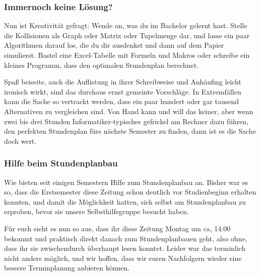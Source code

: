 \begin{multicols}{2}
\subsubsection{Immernoch keine Lösung?}
Nun ist Kreativität gefragt: Wende an, was du im Bachelor gelernt hast. Stelle die Kollisionen als Graph oder Matrix oder Tupelmenge dar, und lasse ein paar Algorithmen darauf los, die du dir ausdenkst und dann auf dem Papier simulierst. Bastel eine Excel-Tabelle mit Formeln und Makros oder schreibe ein kleines Programm, dass den optimalen Stundenplan berechnet. 

Spaß beiseite, auch die Auflistung in ihrer Schreibweise und Anhäufing leicht ironisch wirkt, sind das durchaus ernst gemeinte Vorschläge. In Extremfällen kann die Sache so vertrackt werden, dass ein paar hundert oder gar tausend Alternativen zu vergleichen sind. Von Hand kann und will das keiner, aber wenn zwei bis drei Stunden Informatiker-typisches gefrickel am Rechner dazu führen, den perfekten Stundenplan fürs nächste Semester zu finden, dann ist es die Sache doch wert.

\subsubsection{Hilfe beim Stundenplanbau}
Wie bieten seit einigen Semestern Hilfe zum Stundenplanbau an. Bisher war es so, dass die Erstsemester diese Zeitung schon deutlich vor Studienbeginn erhalten konnten, und damit die Möglichkeit hatten, sich selbst am Stundenplanbau zu erproben, bevor sie unsere Selbsthilfegruppe besucht haben.

Für euch sieht es nun so aus, dass ihr diese Zeitung Montag um ca, 14:00 bekommt und praktisch direkt danach zum Stundenplanbauen geht, also ohne, dass ihr sie zwischendurch überhaupt lesen konntet. Leider war das terminlich nicht anders möglich, und wir hoffen, dass wir euren Nachfolgern wieder eine bessere Terminplanung anbieren können.



\end{multicols}
